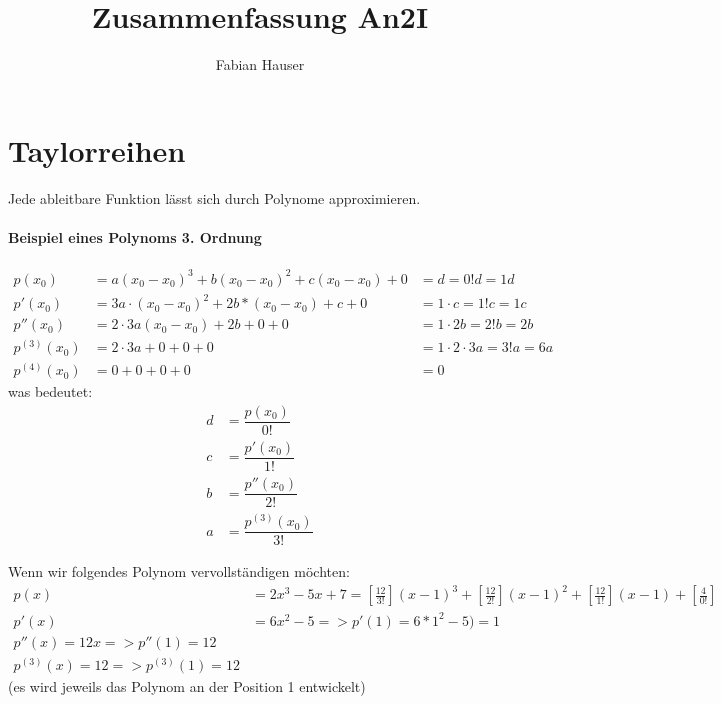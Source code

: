 %


\title{Zusammenfassung An2I}
\author{Fabian Hauser}
 
 \newcommand{\dt}{\text{ }\mathrm{d}t}
 
 \setlength{\columnsep}{0cm}
 \setlength{\columnseprule}{0pt}
 

\maketitle

\section{Taylorreihen}
Jede ableitbare Funktion lässt sich durch Polynome approximieren.


\paragraph{Beispiel eines Polynoms 3. Ordnung}
\begin{align*}
	p(x_0) & = a(x_0-x_0)^3 + b(x_0-x_0)^2 + c(x_0-x_0) + 0 &= d = 0!d = 1d \\
	p'(x_0) &= 3a \cdot (x_0-x_0)^2 + 2b * (x_0-x_0) + c + 0 &= 1 \cdot c = 1!c = 1c \\
	p''(x_0) &= 2 \cdot 3a (x_0-x_0) + 2b + 0 + 0 &= 1 \cdot 2b = 2!b = 2b \\
	p^{(3)}(x_0) &= 2 \cdot 3a + 0 + 0 + 0 &= 1 \cdot 2 \cdot 3a = 3!a = 6a \\
	p^{(4)}(x_0) &= 0 + 0 + 0 + 0 &= 0
\end{align*}
was bedeutet:
\begin{align*}
	d &= \dfrac{p(x_0)}{0!} \\
	c &= \dfrac{p'(x_0)}{1!} \\
	b &= \dfrac{p''(x_0)}{2!} \\
	a &= \dfrac{p^{(3)}(x_0)}{3!}
\end{align*}

Wenn wir folgendes Polynom vervollständigen möchten:
\begin{align*}
	p(x) &= 2x^3 - 5x + 7 = [\frac{12}{3!}](x-1)^3 + [\frac{12}{2!}](x-1)^2 + [\frac{12}{1!}](x-1) + [\frac{4}{0!}] \\
	p'(x) &= 6x^2 - 5 => p'(1) = 6 * 1^2 -5 ) =1 \\
	p''(x) = 12x => p''(1) = 12 \\
	p^{(3)}(x) = 12 => p^{(3)}(1) = 12
\end{align*}
(es wird jeweils das Polynom an der Position 1 entwickelt)

